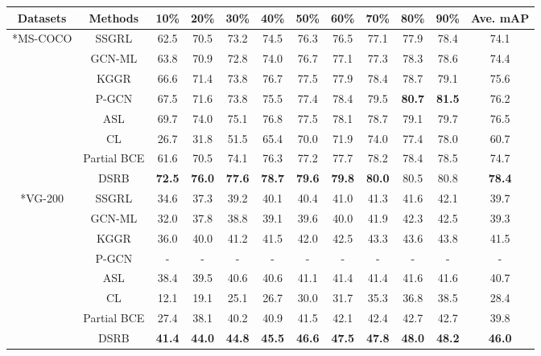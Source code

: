 \documentclass[lettersize,journal]{IEEEtran}
\begin{document}
\begin{table*}
  \centering
  \small
  \begin{tabular}{c|c|ccccccccc|c}
  \hline
  \centering Datasets & Methods & 10\% & 20\% & 30\% & 40\% & 50\% & 60\% & 70\% & 80\% & 90\% & Ave. mAP \\
  \hline
  \hline
  \centering \multirow{8}*{MS-COCO} & SSGRL & 62.5 & 70.5 & 73.2 & 74.5 & 76.3 & 76.5 & 77.1 & 77.9 & 78.4 & 74.1 \\
  \centering ~ & GCN-ML & 63.8 & 70.9 & 72.8 & 74.0 & 76.7 & 77.1 & 77.3 & 78.3 & 78.6 & 74.4 \\
  \centering ~ & KGGR & 66.6 & 71.4 & 73.8 & 76.7 & 77.5 & 77.9 & 78.4 & 78.7 & 79.1 & 75.6 \\
  \centering ~ & P-GCN & 67.5 & 71.6 & 73.8 & 75.5 & 77.4 & 78.4 & 79.5 & \textbf{80.7} & \textbf{81.5} & 76.2 \\
  \centering ~ & ASL & 69.7 & 74.0 & 75.1 & 76.8 & 77.5 & 78.1 & 78.7 & 79.1 & 79.7 & 76.5 \\
  \centering ~ & CL & 26.7 & 31.8 & 51.5 & 65.4 & 70.0 & 71.9 & 74.0 & 77.4 & 78.0 & 60.7 \\
  \centering ~ & Partial BCE & 61.6 & 70.5 & 74.1 & 76.3 & 77.2 & 77.7 & 78.2 & 78.4 & 78.5 & 74.7 \\
  \centering ~ & DSRB & \textbf{72.5} & \textbf{76.0} & \textbf{77.6} & \textbf{78.7} & \textbf{79.6} & \textbf{79.8} & \textbf{80.0} & 80.5 & 80.8 & \textbf{78.4} \\
  \hline
  \hline
  \centering \multirow{8}*{VG-200} & SSGRL & 34.6 & 37.3 & 39.2 & 40.1 & 40.4 & 41.0 & 41.3 & 41.6 & 42.1 & 39.7 \\
  \centering ~ & GCN-ML & 32.0 & 37.8 & 38.8 & 39.1 & 39.6 & 40.0 & 41.9 & 42.3 & 42.5 & 39.3 \\
  \centering ~ & KGGR & 36.0 & 40.0 & 41.2 & 41.5 & 42.0 & 42.5 & 43.3 & 43.6 & 43.8 & 41.5 \\
  \centering ~ & P-GCN & - & - & - & - & - & - & - & - & - & - \\
  \centering ~ & ASL & 38.4 & 39.5 & 40.6 & 40.6 & 41.1 & 41.4 & 41.4 & 41.6 & 41.6 & 40.7 \\
  \centering ~ & CL & 12.1 & 19.1 & 25.1 & 26.7 & 30.0 & 31.7 & 35.3 & 36.8 & 38.5 & 28.4 \\
  \centering ~ & Partial BCE & 27.4 & 38.1 & 40.2 & 40.9 & 41.5 & 42.1 & 42.4 & 42.7 & 42.7 & 39.8 \\
  \centering ~ & DSRB & \textbf{41.4} & \textbf{44.0} & \textbf{44.8} & \textbf{45.5} & \textbf{46.6} & \textbf{47.5} & \textbf{47.8} & \textbf{48.0} & \textbf{48.2} & \textbf{46.0} \\

\end{tabular}
\end{table*}
\end{document}
